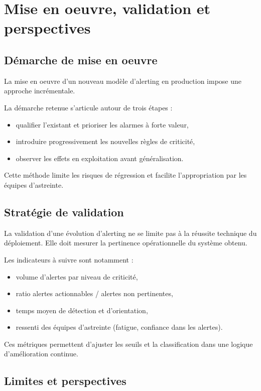 \chapter{Mise en oeuvre, validation et perspectives}

\section{Démarche de mise en oeuvre}

La mise en oeuvre d'un nouveau modèle d'alerting en production impose une approche incrémentale.

La démarche retenue s'articule autour de trois étapes :
\begin{itemize}
	\item qualifier l'existant et prioriser les alarmes à forte valeur,
	\item introduire progressivement les nouvelles règles de criticité,
	\item observer les effets en exploitation avant généralisation.
\end{itemize}

Cette méthode limite les risques de régression et facilite l'appropriation par les équipes d'astreinte.

\section{Stratégie de validation}

La validation d'une évolution d'alerting ne se limite pas à la réussite technique du déploiement. Elle doit mesurer
la pertinence opérationnelle du système obtenu.

Les indicateurs à suivre sont notamment :
\begin{itemize}
	\item volume d'alertes par niveau de criticité,
	\item ratio alertes actionnables / alertes non pertinentes,
	\item temps moyen de détection et d'orientation,
	\item ressenti des équipes d'astreinte (fatigue, confiance dans les alertes).
\end{itemize}

Ces métriques permettent d'ajuster les seuils et la classification dans une logique d'amélioration continue.

\section{Limites et perspectives}

